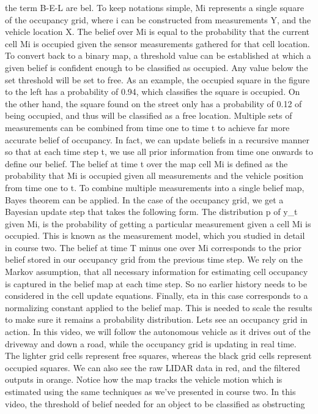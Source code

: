 the term B-E-L are bel. To keep notations simple, Mi represents a single square
of the occupancy grid, where i can be constructed
from measurements Y, and the vehicle location X. The belief over Mi is equal to the probability
that the current cell Mi is occupied given the sensor measurements gathered
for that cell location. To convert back to a binary map, a threshold value can
be established at which a given belief is confident enough to be classified
as occupied. Any value below the set
threshold will be set to free. As an example,
the occupied square in the figure to the left has
a probability of 0.94, which classifies
the square is occupied. On the other hand, the square found on the street only has a probability of 0.12
of being occupied, and thus will be classified
as a free location. Multiple sets of
measurements can be combined from time one to time t to achieve far more accurate
belief of occupancy. In fact, we can update beliefs in a recursive manner so
that at each time step t, we use all prior information from time one onwards to
define our belief. The belief at time t
over the map cell Mi is defined as
the probability that Mi is occupied given all measurements and the vehicle
position from time one to t. To combine multiple measurements
into a single belief map, Bayes theorem can be applied. In the case of the
occupancy grid, we get a Bayesian update step that takes the following form. The distribution p
of y_t given Mi, is the probability of getting a particular measurement
given a cell Mi is occupied. This is known as
the measurement model, which you studied in
detail in course two. The belief at time T minus
one over Mi corresponds to the prior belief stored in our occupancy grid from
the previous time step. We rely on the Markov assumption, that all necessary
information for estimating cell occupancy is captured in the belief map
at each time step. So no earlier history needs to be considered in
the cell update equations. Finally, eta in this case corresponds to a normalizing constant applied
to the belief map. This is needed to scale
the results to make sure it remains
a probability distribution. Lets see an occupancy
grid in action. In this video, we will follow the autonomous vehicle as it drives out of the driveway
and down a road, while the occupancy grid
is updating in real time. The lighter grid cells
represent free squares, whereas the black grid cells
represent occupied squares. We can also see
the raw LIDAR data in red, and the filtered
outputs in orange. Notice how the map tracks
the vehicle motion which is estimated using
the same techniques as we've presented in course two. In this video, the threshold of belief needed for an object to be classified as obstructing
